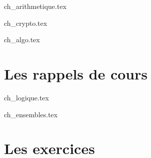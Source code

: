 {ch_arithmetique.tex}

{ch_crypto.tex}

{ch_algo.tex}

\part{Les rappels de cours}

{ch_logique.tex}

{ch_ensembles.tex}

\part{Les exercices}



